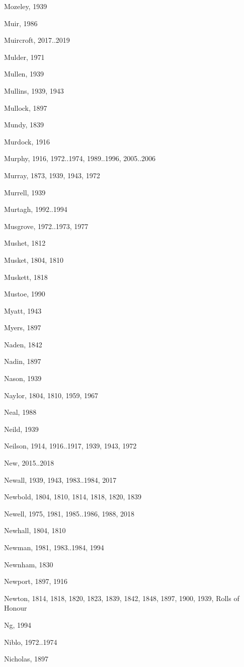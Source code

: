 \begin{theindex}
\item Mozeley, 1939
\item Muir, 1986
\item Muircroft, 2017..2019
\item Mulder, 1971
\item Mullen, 1939
\item Mullins, 1939, 1943
\item Mullock, 1897
\item Mundy, 1839
\item Murdock, 1916
\item Murphy, 1916, 1972..1974, 1989..1996, 2005..2006
\item Murray, 1873, 1939, 1943, 1972
\item Murrell, 1939
\item Murtagh, 1992..1994
\item Musgrove, 1972..1973, 1977
\item Mushet, 1812
\item Musket, 1804, 1810
\item Muskett, 1818
\item Mustoe, 1990
\item Myatt, 1943
\item Myers, 1897
\item Naden, 1842
\item Nadin, 1897
\item Nason, 1939
\item Naylor, 1804, 1810, 1959, 1967
\item Neal, 1988
\item Neild, 1939
\item Neilson, 1914, 1916..1917, 1939, 1943, 1972
\item New, 2015..2018
\item Newall, 1939, 1943, 1983..1984, 2017
\item Newbold, 1804, 1810, 1814, 1818, 1820, 1839
\item Newell, 1975, 1981, 1985..1986, 1988, 2018
\item Newhall, 1804, 1810
\item Newman, 1981, 1983..1984, 1994
\item Newnham, 1830
\item Newport, 1897, 1916
\item Newton, 1814, 1818, 1820, 1823, 1839, 1842, 1848, 1897, 1900, 1939, Rolls of Honour
\item Ng, 1994
\item Niblo, 1972..1974
\item Nicholas, 1897

\end{theindex}
